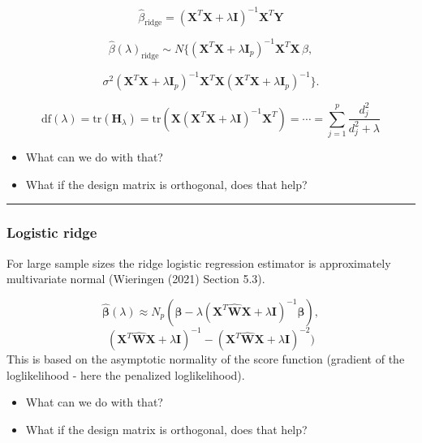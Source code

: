 \documentclass[
  letterpaper,
  DIV=11,
  numbers=noendperiod]{scrartcl}
\providecommand{\tightlist}{%
  \setlength{\itemsep}{0pt}\setlength{\parskip}{0pt}}\usepackage{longtable,booktabs,array}
\begin{document}
\[ \hat{\beta}_{\text{ridge}}=({\boldsymbol X}^T{\boldsymbol X}+\lambda {\boldsymbol I})^{-1} {\boldsymbol X}^T {\boldsymbol Y}\]

\[\hat{\beta}(\lambda)_{\text{ridge}} \sim N \{ (\boldsymbol{X}^T \boldsymbol{X} + \lambda \boldsymbol{I}_{p})^{-1} \boldsymbol{X}^T \boldsymbol{X} \, \beta,\]

\[\sigma^2 ( \boldsymbol{X}^T \boldsymbol{X} + \lambda \boldsymbol{I}_{p} )^{-1}  \boldsymbol{X}^T \boldsymbol{X} ( \boldsymbol{X}^T \boldsymbol{X} + \lambda \boldsymbol{I}_{p} )^{-1}  \}.\]

\[\text{df}(\lambda)=\text{tr}({\boldsymbol H}_{\lambda})=\text{tr}({\boldsymbol X}({\boldsymbol X}^T{\boldsymbol X}+ \lambda {\boldsymbol I})^{-1}{\boldsymbol X}^T)=\cdots=\sum_{j=1}^p \frac{d_j^2}{d_j^2+\lambda}\]

\begin{itemize}
\tightlist
\item
  What can we do with that?
\item
  What if the design matrix is orthogonal, does that help?
\end{itemize}

\begin{center}\rule{0.5\linewidth}{0.5pt}\end{center}

\hypertarget{logistic-ridge}{%
\subsubsection{Logistic ridge}\label{logistic-ridge}}

For large sample sizes the ridge logistic regression estimator is
approximately multivariate normal (Wieringen (2021) Section 5.3).

\[\hat{\boldsymbol\beta}(\lambda) \approx N_{p}(\boldsymbol\beta-\lambda (\boldsymbol X^T\hat{\boldsymbol{W}}\boldsymbol X+\lambda \boldsymbol I)^{-1}\boldsymbol \beta),\]
\[(\boldsymbol X^T\hat{\boldsymbol{W}}\boldsymbol X+\lambda \boldsymbol I)^{-1}-(\boldsymbol X^T\hat{\boldsymbol{W}}\boldsymbol X+\lambda \boldsymbol I)^{-2})\]
This is based on the asymptotic normality of the score function
(gradient of the loglikelihood - here the penalized loglikelihood).

\begin{itemize}
\tightlist
\item
  What can we do with that?
\item
  What if the design matrix is orthogonal, does that help?
\end{itemize}
\end{document}
